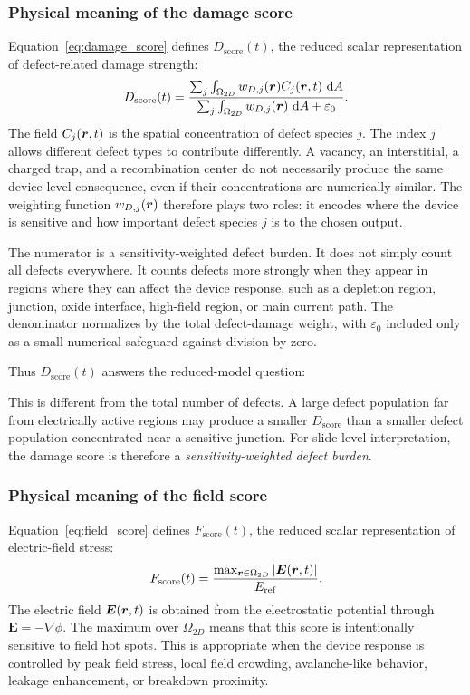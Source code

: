 \documentclass[11pt]{article}
\begin{document}
\subsubsection{Physical meaning of the damage score}
Equation~\eqref{eq:damage_score} defines \(D_{\mathrm{score}}(t)\), the reduced scalar representation of defect-related damage strength:
\[
    D_{\mathrm{score}}(t)
    =
    \frac{\sum_j \int_{\Omega_{2D}} w_{D,j}(\bm{r}) C_j(\bm{r},t)\,\mathop{}\!\mathrm{d} A}
    {\sum_j \int_{\Omega_{2D}} w_{D,j}(\bm{r})\,\mathop{}\!\mathrm{d} A+\varepsilon_0}.
\]
The field \(C_j(\bm{r},t)\) is the spatial concentration of defect species \(j\). The index \(j\) allows different defect types to contribute differently. A vacancy, an interstitial, a charged trap, and a recombination center do not necessarily produce the same device-level consequence, even if their concentrations are numerically similar. The weighting function \(w_{D,j}(\bm{r})\) therefore plays two roles: it encodes where the device is sensitive and how important defect species \(j\) is to the chosen output.

The numerator is a sensitivity-weighted defect burden. It does not simply count all defects everywhere. It counts defects more strongly when they appear in regions where they can affect the device response, such as a depletion region, junction, oxide interface, high-field region, or main current path. The denominator normalizes by the total defect-damage weight, with \(\varepsilon_0\) included only as a small numerical safeguard against division by zero.

Thus \(D_{\mathrm{score}}(t)\) answers the reduced-model question:
\begin{center}
\end{center}
This is different from the total number of defects. A large defect population far from electrically active regions may produce a smaller \(D_{\mathrm{score}}\) than a smaller defect population concentrated near a sensitive junction. For slide-level interpretation, the damage score is therefore a \emph{sensitivity-weighted defect burden}.

\subsubsection{Physical meaning of the field score}
Equation~\eqref{eq:field_score} defines \(F_{\mathrm{score}}(t)\), the reduced scalar representation of electric-field stress:
\[
    F_{\mathrm{score}}(t)
    =
    \frac{\max_{\bm{r}\in\Omega_{2D}} \abs{\bm{E}(\bm{r},t)}}
    {E_{\mathrm{ref}}}.
\]
The electric field \(\bm{E}(\bm{r},t)\) is obtained from the electrostatic potential through \(\bm{E}=-\nabla\phi\). The maximum over \(\Omega_{2D}\) means that this score is intentionally sensitive to field hot spots. This is appropriate when the device response is controlled by peak field stress, local field crowding, avalanche-like behavior, leakage enhancement, or breakdown proximity.
\end{document}
